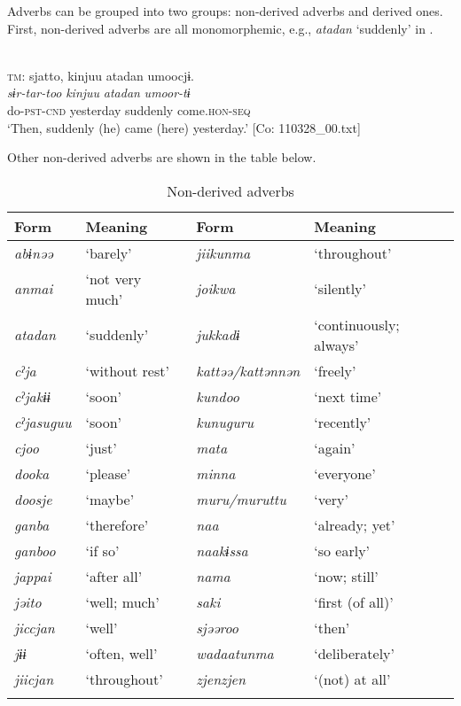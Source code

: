   Adverbs can be grouped into two groups: non-derived adverbs and derived ones. First, non-derived adverbs are all monomorphemic, e.g., \textit{atadan} ‘suddenly’ in .

\ea{} \label{ex:4.53}\\
\glll  \textsc{tm}:  sjatto,  kinjuu  atadan  umoocjɨ.\\
    \textit{sɨr-tar-too}  \textit{kinjuu}  \textit{atadan}  \textit{umoor-tɨ}\\
    do-\textsc{pst}-\textsc{cnd}  yesterday  suddenly  come.\textsc{hon}-\textsc{seq}\\
  \glt     ‘Then, suddenly (he) came (here) yesterday.’ [Co: 110328\_00.txt]
\z

Other non-derived adverbs are shown in the table below.

\begin{table}
\caption{\label{tab:27}Non-derived adverbs}
\begin{tabular}{llll}
\lsptoprule
Form & Meaning  &  Form & Meaning\\\midrule
\textit{abɨnəə} & ‘barely’  &  \textit{jiikunma} & ‘throughout’\\
\textit{anmai} & ‘not very much’  &  \textit{joikwa} & ‘silently’\\
\textit{atadan} & ‘suddenly’  &  \textit{jukkadɨ} & ‘continuously; always’\\
\textit{cˀja} & ‘without rest’  &  \textit{kattəə/kattənnən} & ‘freely’\\
\textit{cˀjakɨɨ} & ‘soon’  &  \textit{kundoo} & ‘next time’\\
\textit{cˀjasuguu} & ‘soon’  &  \textit{kunuguru} & ‘recently’\\
\textit{cjoo} & ‘just’  &  \textit{mata} & ‘again’\\
\textit{dooka} & ‘please’  &  \textit{minna} & ‘everyone’\\
\textit{doosje} & ‘maybe’  &  \textit{muru/muruttu} & ‘very’\\
\textit{ganba} & ‘therefore’  &  \textit{naa} & ‘already; yet’\\
\textit{ganboo} & ‘if so’  &  \textit{naakɨssa} & ‘so early’\\
\textit{jappai} & ‘after all’  &  \textit{nama} & ‘now; still’\\
\textit{jəito} & ‘well; much’  &  \textit{saki} & ‘first (of all)’\\
\textit{jiccjan} & ‘well’  &  \textit{sjəəroo} & ‘then’\\
\textit{jɨɨ} & ‘often, well’  &  \textit{wadaatunma} & ‘deliberately’\\
\textit{jiicjan} & ‘throughout’  &  \textit{zjenzjen} & ‘(not) at all’\\
\lspbottomrule
\end{tabular}
\end{table}

